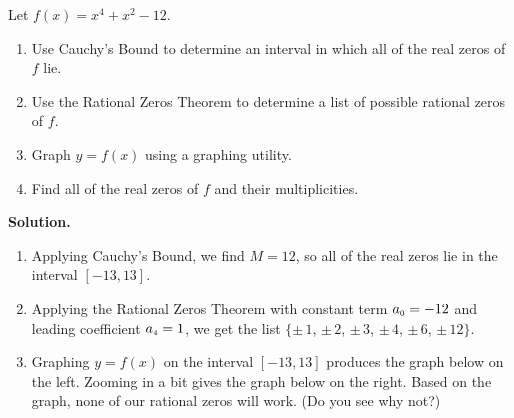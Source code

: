 \begin{ex}  \label{polyquadinform} Let $f(x) = x^4 + x^2 - 12$.

\begin{enumerate}

\item  Use Cauchy's Bound to determine an interval in which all of the real zeros of $f$ lie.

\item  Use the Rational Zeros Theorem to determine a list of possible rational zeros of $f$.

\item  Graph $y=f(x)$ using a graphing utility.

\item  Find all of the real zeros of $f$ and their multiplicities.


\end{enumerate}

{\bf Solution.}

\begin{enumerate}

\item  Applying Cauchy's Bound, we find $M = 12$, so all of the real zeros lie in the interval $[-13,13]$.

\item  Applying the Rational Zeros Theorem with constant term $a_{\mbox{\tiny$0$}} = -12$ and leading coefficient $a_{\mbox{\tiny$4$}} = 1$, we get the list $\{\pm \, 1$, $\pm \, 2$, $\pm \, 3$, $\pm \, 4$, $\pm \, 6$, $\pm \, 12\}$.

\item  Graphing $y=f(x)$ on the interval $[-13,13]$ produces the graph below on the left.  Zooming in a bit gives the graph below on the right.  Based on the graph, none of our rational zeros will work. (Do you see why not?)


\begin{center}

\begin{tabular}{cc}


\end{tabular}
\end{center}
\end{enumerate}
\end{ex}
